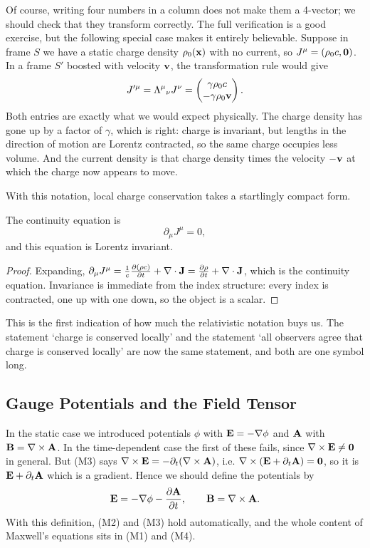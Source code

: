 \documentclass[a4paper]{scrartcl}
\begin{document}
Of course, writing four numbers in a column does not make them a 4-vector; we should check that they transform correctly. The full verification is a good exercise, but the following special case makes it entirely believable. Suppose in frame $S$ we have a static charge density $\rho_0(\mathbf{x})$ with no current, so $J^\mu = (\rho_0 c, \mathbf{0})$. In a frame $S'$ boosted with velocity $\mathbf{v}$, the transformation rule would give
$$
J'^\mu = \Lambda^\mu{}_\nu J^\nu = \begin{pmatrix} \gamma\rho_0 c\\ -\gamma\rho_0 \mathbf{v}\end{pmatrix}.
$$
Both entries are exactly what we would expect physically. The charge density has gone up by a factor of $\gamma$, which is right: charge is invariant, but lengths in the direction of motion are Lorentz contracted, so the same charge occupies less volume. And the current density is that charge density times the velocity $-\mathbf{v}$ at which the charge now appears to move.

With this notation, local charge conservation takes a startlingly compact form.

\begin{proposition}
	The continuity equation is
	$$
	\partial_\mu J^\mu = 0,
	$$
	and this equation is Lorentz invariant.
\end{proposition}
\begin{proof}
	Expanding, $\partial_\mu J^\mu = \frac{1}{c}\frac{\partial (\rho c)}{\partial t} + \nabla\cdot\mathbf{J} = \frac{\partial \rho}{\partial t} + \nabla\cdot \mathbf{J}$, which is the continuity equation. Invariance is immediate from the index structure: every index is contracted, one up with one down, so the object is a scalar.
\end{proof}

This is the first indication of how much the relativistic notation buys us. The statement `charge is conserved locally' and the statement `all observers agree that charge is conserved locally' are now the same statement, and both are one symbol long.

\subsection{Gauge Potentials and the Field Tensor}

In the static case we introduced potentials $\phi$ with $\mathbf{E} = -\nabla\phi$ and $\mathbf{A}$ with $\mathbf{B} = \nabla\times\mathbf{A}$. In the time-dependent case the first of these fails, since $\nabla\times\mathbf{E} \neq \mathbf{0}$ in general. But (M3) says $\nabla\times \mathbf{E} = -\partial_t(\nabla\times\mathbf{A})$, i.e. $\nabla\times(\mathbf{E} + \partial_t \mathbf{A}) = \mathbf{0}$, so it is $\mathbf{E}+\partial_t\mathbf{A}$ which is a gradient. Hence we should define the potentials by
$$
\mathbf{E} = -\nabla\phi - \frac{\partial \mathbf{A}}{\partial t}, \qquad \mathbf{B} = \nabla\times\mathbf{A}.
$$
With this definition, (M2) and (M3) hold automatically, and the whole content of Maxwell's equations sits in (M1) and (M4).
\end{document}
